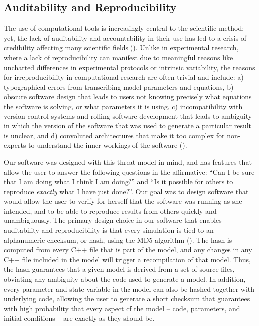 \documentclass{frontiersSCNS} %
\begin{document}
\subsection{Auditability and Reproducibility}

The use of computational tools is increasingly central to the scientific method; yet, the lack of auditability and accountability in their use has led to a crisis of credibility affecting many scientific fields (\cite{stoddenEnhancingReproducibilityComputational2016, bakerWhyScientistsMust2016}). Unlike in experimental research, where a lack of reproducibility can manifest due to meaningful reasons like uncharted differences in experimental protocols or intrinsic variability, the reasons for irreproducibility in computational research are often trivial and include: a) typographical errors from transcribing model parameters and equations, b) obscure software design that leads to users not knowing precisely what equations the software is solving, or what parameters it is using, c) incompatibility with version control systems and rolling software development that leads to ambiguity in which the version of the software that was used to generate a particular result is unclear, and d) convoluted architectures that make it too complex for non-experts to understand the inner workings of the software (\cite{xuMeasurementSourceCode2017, sedanoCodeReadabilityTesting2016, vikstromStudyAutomaticTranslation2009}).

Our software was designed with this threat model in mind, and has features that allow the user to answer the following questions in the affirmative: ``Can I be sure that I am doing what I think I am doing?'' and ``Is it possible for others to reproduce {\em exactly} what I have just done?''. Our goal was to design software that would allow the user to verify for herself that the software was running as she intended, and to be able to reproduce results from others quickly and unambiguously. The primary design choice in our software that enables auditability and reproducibility is that every simulation is tied to an alphanumeric checksum, or hash, using the MD5 algorithm (\cite{rivestMD5MessageDigestAlgorithm1992}). The hash is computed from every C++ file that is part of the model, and any changes in any C++ file included in the model will trigger a recompilation of that model. Thus, the hash guarantees that a given model is derived from a set of source files, obviating any ambiguity about the code used to generate a model. In addition, every parameter and state variable in the model can also be hashed together with underlying code, allowing the user to generate a short checksum that guarantees with high probability that every aspect of the model -- code, parameters, and initial conditions -- are exactly as they should be.
\end{document}
